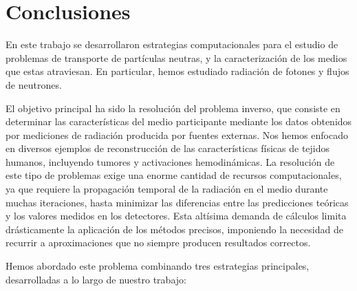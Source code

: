 \pagestyle{fancy}
\chapter{Conclusiones}
\lhead{\thepage}
\vspace{0.01\textheight}
\pagebreak

En este trabajo se desarrollaron estrategias computacionales para el 
estudio de problemas de transporte de partículas neutras, y la 
caracterización de los medios que estas atraviesan.
En particular, hemos estudiado radiación de fotones y 
flujos de neutrones.

El objetivo principal ha sido la resolución del 
problema inverso, que consiste en determinar las características 
del medio participante mediante los datos obtenidos por mediciones 
de radiación producida por fuentes externas.
Nos hemos enfocado en diversos ejemplos de 
reconstrucción de las características físicas de tejidos humanos, 
incluyendo tumores y activaciones hemodinámicas.
La resolución de este tipo de problemas exige una enorme cantidad 
de recursos computacionales, ya que requiere la propagación temporal 
de la radiación en el medio durante muchas iteraciones, 
hasta minimizar las diferencias entre las predicciones teóricas y 
los valores medidos en los detectores. 
Esta altísima demanda de cálculos limita drásticamente 
la aplicación de los métodos precisos, imponiendo la necesidad de 
recurrir a aproximaciones que no siempre producen resultados correctos.

Hemos abordado este problema combinando tres estrategias principales, 
desarrolladas a lo largo de nuestro trabajo:

